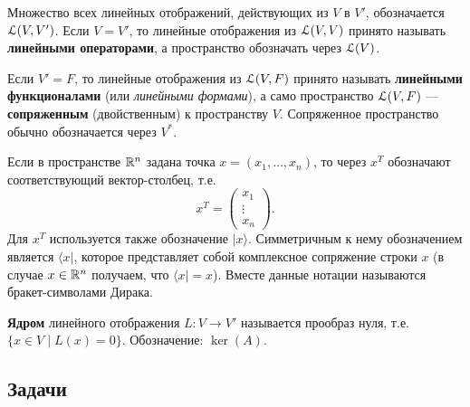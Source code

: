 Множество всех линейных отображений, действующих из $V$ в $V'$, обозначается $\mathcal L(V,V')$. Если $V=V'$, то линейные отображения из $\mathcal L(V,V)$ принято называть \textbf{линейными операторами}, а пространство обозначать через $\mathcal L(V)$.

Если $V'=F$, то линейные отображения из $\mathcal L(V,F)$ принято называть \textbf{линейными функционалами} (или \textit{линейными формами}), а само пространство $\mathcal L(V,F)$ --- \textbf{сопряженным} (двойственным) к пространству $V$. Сопряженное пространство обычно обозначается  через $V^*$.

Если в пространстве $\mathbb R^n$ задана точка $x=(x_1,\dots,x_n)$, то через $x^T$ обозначают соответствующий вектор-столбец, т.е.
$$
x^T=\begin{pmatrix}
x_1 \\ \vdots \\ x_n
\end{pmatrix}.
$$
Для $x^T$ используется также обозначение $|x\rangle$. Симметричным к нему обозначением является $\langle x|$, которое представляет собой комплексное сопряжение строки $x$ (в случае $x\in \mathbb R^n$ получаем, что $\langle x|=x$). Вместе данные нотации называются бракет-символами Дирака.

\textbf{Ядром} линейного отображения $L:V\to V'$ называется прообраз нуля, т.е. $\{x\in V\mid L(x)=0\}$. Обозначение: $\ker(A)$.



\subsection*{Задачи}

